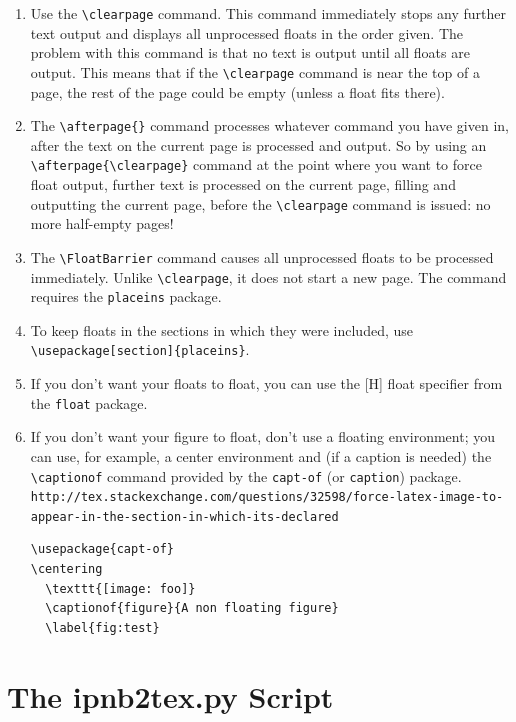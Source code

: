 \documentclass[english]{workpackage}[1996/06/02]
\begin{document}
\begin{enumerate}
\item
 Use the \verb+\clearpage+ command.  This command immediately stops any further text output and displays all unprocessed floats in the order given.  The problem with this command is that no text is output until all floats are output. This means that if the \verb+\clearpage+ command is near the top of a page, the rest of the page could be empty (unless a float fits there).  

\item
The \verb+\afterpage{}+ command processes whatever command you have given in, after the text on the current page is processed and output. So by using an \verb+\afterpage{\clearpage}+ command at the point where you want to force float output, further text is processed on the current page, filling and outputting  the current page, before the \verb+\clearpage+ command is issued: no more half-empty pages!

\item
The \verb"\FloatBarrier" command causes all unprocessed floats to be processed
immediately. Unlike \verb"\clearpage", it does not start a new page. The command requires the \texttt{placeins} package.

\item
To keep floats in the sections in which they were included, use 
\verb"\usepackage[section]{placeins}".

\item
If you don't want your floats to float, you can use the [H] float specifier from the \verb"float" package. 

\item
If you don't want your figure to float, don't use a floating environment; you can use, for example, a center environment and (if a caption is needed) the \verb"\captionof" command provided by the \texttt{capt-of} (or \texttt{caption}) package.
\lstinline{http://tex.stackexchange.com/questions/32598/force-latex-image-to-appear-in-the-section-in-which-its-declared}


\begin{lstlisting}
\usepackage{capt-of}
\centering
  \texttt{[image: foo]}
  \captionof{figure}{A non floating figure}
  \label{fig:test}
\end{lstlisting}


\end{enumerate}
\clearpage
\chapter{The ipnb2tex.py Script}
\label{sec:Theipnb2texpyScript}
\end{document}
